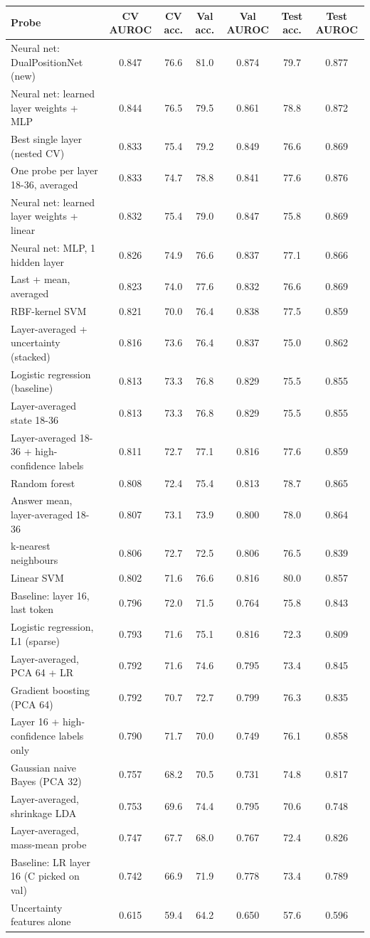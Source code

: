 \begin{tabular}{lcccccc}
\toprule
Probe & CV AUROC & CV acc. & Val acc. & Val AUROC & Test acc. & Test AUROC \\
\midrule
Neural net: DualPositionNet (new) & 0.847 & 76.6 & 81.0 & 0.874 & 79.7 & 0.877 \\
Neural net: learned layer weights + MLP & 0.844 & 76.5 & 79.5 & 0.861 & 78.8 & 0.872 \\
Best single layer (nested CV) & 0.833 & 75.4 & 79.2 & 0.849 & 76.6 & 0.869 \\
One probe per layer 18-36, averaged & 0.833 & 74.7 & 78.8 & 0.841 & 77.6 & 0.876 \\
Neural net: learned layer weights + linear & 0.832 & 75.4 & 79.0 & 0.847 & 75.8 & 0.869 \\
Neural net: MLP, 1 hidden layer & 0.826 & 74.9 & 76.6 & 0.837 & 77.1 & 0.866 \\
Last + mean, averaged & 0.823 & 74.0 & 77.6 & 0.832 & 76.6 & 0.869 \\
RBF-kernel SVM & 0.821 & 70.0 & 76.4 & 0.838 & 77.5 & 0.859 \\
Layer-averaged + uncertainty (stacked) & 0.816 & 73.6 & 76.4 & 0.837 & 75.0 & 0.862 \\
Logistic regression (baseline) & 0.813 & 73.3 & 76.8 & 0.829 & 75.5 & 0.855 \\
Layer-averaged state 18-36 & 0.813 & 73.3 & 76.8 & 0.829 & 75.5 & 0.855 \\
Layer-averaged 18-36 + high-confidence labels & 0.811 & 72.7 & 77.1 & 0.816 & 77.6 & 0.859 \\
Random forest & 0.808 & 72.4 & 75.4 & 0.813 & 78.7 & 0.865 \\
Answer mean, layer-averaged 18-36 & 0.807 & 73.1 & 73.9 & 0.800 & 78.0 & 0.864 \\
k-nearest neighbours & 0.806 & 72.7 & 72.5 & 0.806 & 76.5 & 0.839 \\
Linear SVM & 0.802 & 71.6 & 76.6 & 0.816 & 80.0 & 0.857 \\
Baseline: layer 16, last token & 0.796 & 72.0 & 71.5 & 0.764 & 75.8 & 0.843 \\
Logistic regression, L1 (sparse) & 0.793 & 71.6 & 75.1 & 0.816 & 72.3 & 0.809 \\
Layer-averaged, PCA 64 + LR & 0.792 & 71.6 & 74.6 & 0.795 & 73.4 & 0.845 \\
Gradient boosting (PCA 64) & 0.792 & 70.7 & 72.7 & 0.799 & 76.3 & 0.835 \\
Layer 16 + high-confidence labels only & 0.790 & 71.7 & 70.0 & 0.749 & 76.1 & 0.858 \\
Gaussian naive Bayes (PCA 32) & 0.757 & 68.2 & 70.5 & 0.731 & 74.8 & 0.817 \\
Layer-averaged, shrinkage LDA & 0.753 & 69.6 & 74.4 & 0.795 & 70.6 & 0.748 \\
Layer-averaged, mass-mean probe & 0.747 & 67.7 & 68.0 & 0.767 & 72.4 & 0.826 \\
Baseline: LR layer 16 (C picked on val) & 0.742 & 66.9 & 71.9 & 0.778 & 73.4 & 0.789 \\
Uncertainty features alone & 0.615 & 59.4 & 64.2 & 0.650 & 57.6 & 0.596 \\
\bottomrule
\end{tabular}
